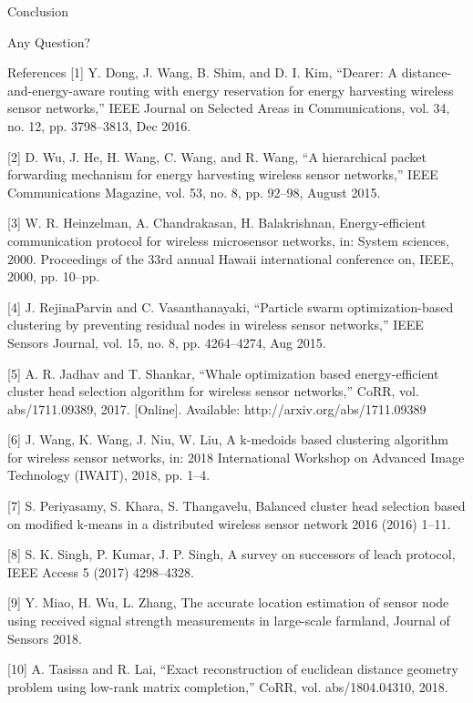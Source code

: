 \documentclass{beamer}
\begin{document}
\begin{frame}[t]{Conclusion} \vspace{30pt}
\Huge
\begin{center}
Any Question?
\end{center}
\end{frame}

\begin{frame}[t]{References}
\tiny
[1] Y. Dong, J. Wang, B. Shim, and D. I. Kim, “Dearer: A distance-and-energy-aware routing with energy reservation for energy harvesting wireless sensor networks,” IEEE Journal on Selected Areas in Communications, vol. 34, no. 12, pp. 3798–3813, Dec 2016.

[2] D. Wu, J. He, H. Wang, C. Wang, and R. Wang, “A hierarchical packet forwarding mechanism for energy harvesting wireless sensor networks,” IEEE Communications Magazine, vol. 53, no. 8, pp. 92–98, August 2015.

[3] W. R. Heinzelman, A. Chandrakasan, H. Balakrishnan, Energy-efficient communication protocol for wireless microsensor networks, in: System sciences, 2000. Proceedings of the 33rd annual Hawaii international conference on, IEEE, 2000, pp. 10–pp.

[4] J. RejinaParvin and C. Vasanthanayaki, “Particle swarm optimization-based clustering by preventing residual nodes in wireless sensor networks,” IEEE Sensors Journal, vol. 15, no. 8, pp. 4264–4274, Aug 2015.

[5] A. R. Jadhav and T. Shankar, “Whale optimization based energy-efficient cluster head selection algorithm for wireless sensor networks,” CoRR, vol. abs/1711.09389, 2017. [Online]. Available: http://arxiv.org/abs/1711.09389

[6] J. Wang, K. Wang, J. Niu, W. Liu, A k-medoids based clustering algorithm for wireless sensor networks, in: 2018 International Workshop on Advanced Image Technology (IWAIT), 2018, pp. 1–4.

[7] S. Periyasamy, S. Khara, S. Thangavelu, Balanced cluster head selection based on modified k-means in a distributed wireless sensor network 2016 (2016) 1–11.

[8] S. K. Singh, P. Kumar, J. P. Singh, A survey on successors of leach protocol, IEEE Access 5 (2017) 4298–4328.

[9] Y. Miao, H. Wu, L. Zhang, The accurate location estimation of sensor node using received signal strength measurements in large-scale farmland, Journal of Sensors 2018.

[10] A. Tasissa and R. Lai, “Exact reconstruction of euclidean distance geometry problem using low-rank matrix completion,” CoRR, vol. abs/1804.04310, 2018.

\end{frame}
\end{document}
